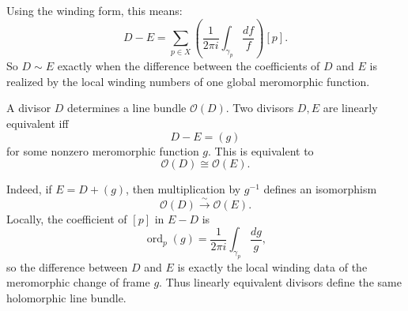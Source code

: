 \documentclass[11pt]{article}
\begin{document}
Using the winding form, this means:
\[
D-E
=
\sum_{p\in X}
\left(
\frac{1}{2\pi i}\int_{\gamma_p}\frac{df}{f}
\right)[p].
\]
So \(D\sim E\) exactly when the difference between the coefficients of \(D\) and \(E\) is realized by the local winding numbers of one global meromorphic function.

\newpage
A divisor \(D\) determines a line bundle \(\mathcal O(D)\). Two divisors \(D,E\) are linearly equivalent iff
\[
D-E=(g)
\]
for some nonzero meromorphic function \(g\). This is equivalent to
\[
\mathcal O(D)\cong \mathcal O(E).
\]

Indeed, if \(E=D+(g)\), then multiplication by \(g^{-1}\) defines an isomorphism
\[
\mathcal O(D)\xrightarrow{\sim}\mathcal O(E).
\]
Locally, the coefficient of \([p]\) in \(E-D\) is
\[
\operatorname{ord}_p(g)=\frac{1}{2\pi i}\int_{\gamma_p}\frac{dg}{g},
\]
so the difference between \(D\) and \(E\) is exactly the local winding data of the meromorphic change of frame \(g\). Thus linearly equivalent divisors define the same holomorphic line bundle.
	
\end{document}
